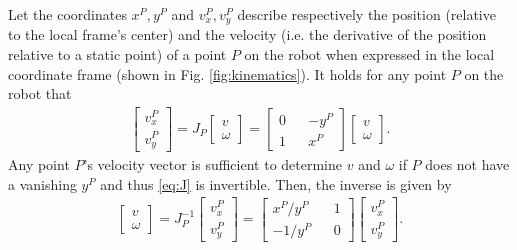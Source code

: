 \documentclass{article}
\begin{document}
Let the coordinates $ x^P, y^P $ and $ v_x^P, v_y^P $ describe respectively the position (relative to the local frame's center) and the velocity (i.e. the derivative of the position relative to a static point) of a point $ P $ on the robot when expressed in the local coordinate frame (shown in Fig. \ref{fig:kinematics}). It holds for any point $ P $ on the robot that
\begin{align}\label{eq:J}
\begin{bmatrix}
v_x^P \\
v_y^P
\end{bmatrix}
= 
J_P
\begin{bmatrix}
v \\
\omega
\end{bmatrix} = 
\begin{bmatrix}
0 && - y^P\\
1 && x^P
\end{bmatrix}
\begin{bmatrix}
v \\
\omega
\end{bmatrix} .
\end{align}
Any point $ P $'s velocity vector is sufficient to determine $ v $ and $ \omega $ if $ P $ does not have a vanishing $ y^P $ and thus \eqref{eq:J} is invertible. Then, the inverse is given by
\begin{align}\label{eq:J^-1}
\begin{bmatrix}
v \\
\omega
\end{bmatrix}
=
J_P^{-1}
\begin{bmatrix}
v_x^P \\
v_y^P
\end{bmatrix} =
\begin{bmatrix}
x^P/y^P && 1\\
-1/y^P && 0
\end{bmatrix}
\begin{bmatrix}
v_x^P \\
v_y^P
\end{bmatrix} .
\end{align}
\end{document}
